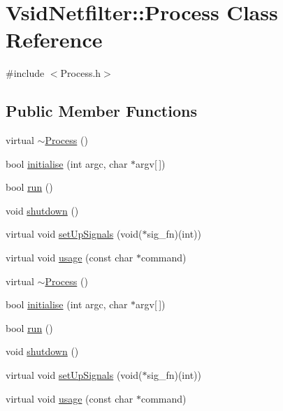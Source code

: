 \hypertarget{class_vsid_netfilter_1_1_process}{\section{Vsid\-Netfilter\-:\-:Process Class Reference}
\label{class_vsid_netfilter_1_1_process}
}


{\ttfamily \#include $<$Process.\-h$>$}

\subsection*{Public Member Functions}
\begin{DoxyCompactItemize}
\item 
virtual \hyperlink{class_vsid_netfilter_1_1_process_a26fb4644e2608c2befc2065ac6a37bc9}{$\sim$\-Process} ()
\item 
bool \hyperlink{class_vsid_netfilter_1_1_process_add484e8839f34ceb0287c50795a20393}{initialise} (int argc, char $\ast$argv\mbox{[}$\,$\mbox{]})
\item 
bool \hyperlink{class_vsid_netfilter_1_1_process_a9377b702ba19852c7747cde2459ff6dc}{run} ()
\item 
void \hyperlink{class_vsid_netfilter_1_1_process_aacbfb7cd570ebf00be2e6f2551b2562b}{shutdown} ()
\item 
virtual void \hyperlink{class_vsid_netfilter_1_1_process_a39de55e5a688f6eb51aeb446767b2631}{set\-Up\-Signals} (void($\ast$sig\-\_\-fn)(int))
\item 
virtual void \hyperlink{class_vsid_netfilter_1_1_process_a4c6eca4e8b5731e78b13ff8a4f9935d9}{usage} (const char $\ast$command)
\item 
virtual \hyperlink{class_vsid_netfilter_1_1_process_a26fb4644e2608c2befc2065ac6a37bc9}{$\sim$\-Process} ()
\item 
bool \hyperlink{class_vsid_netfilter_1_1_process_a13da9bf5f1dadf8343ff684c300fe35e}{initialise} (int argc, char $\ast$argv\mbox{[}$\,$\mbox{]})
\item 
bool \hyperlink{class_vsid_netfilter_1_1_process_aa477798d1d86d5fbe3c84e95c1eb87b0}{run} ()
\item 
void \hyperlink{class_vsid_netfilter_1_1_process_af6bc3c365e14a14a3e897c5685155c7f}{shutdown} ()
\item 
virtual void \hyperlink{class_vsid_netfilter_1_1_process_a38598a0db031d475eb3efd134225ddb4}{set\-Up\-Signals} (void($\ast$sig\-\_\-fn)(int))
\item 
virtual void \hyperlink{class_vsid_netfilter_1_1_process_afc97abd9b61de7cf8ed12a0e78970641}{usage} (const char $\ast$command)
\end{DoxyCompactItemize}
